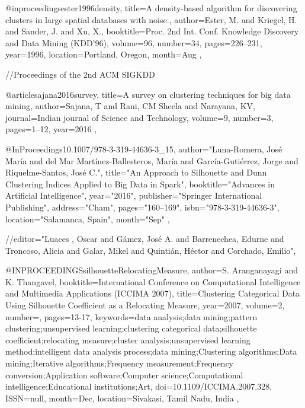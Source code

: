 @inproceedings{ester1996density,
  title={A density-based algorithm for discovering clusters in large spatial databases with noise.},
  author={Ester, M. and Kriegel, H. and Sander, J. and Xu, X.},
  booktitle={Proc. 2nd Int. Conf. Knowledge Discovery and Data Mining (KDD’96)},
  volume={96},
  number={34},
  pages={226--231},
  year={1996},
  location={Portland, Oregon},
  month={Aug}
},

//Proceedings of the 2nd ACM SIGKDD

@article{sajana2016survey,
  title={A survey on clustering techniques for big data mining},
  author={Sajana, T and Rani, CM Sheela and Narayana, KV},
  journal={Indian journal of Science and Technology},
  volume={9},
  number={3},
  pages={1--12},
  year={2016}
},

@InProceedings{10.1007/978-3-319-44636-3_15,
author="Luna-Romera, Jos{\'e} Mar{\'i}a
and del Mar Mart{\'i}nez-Ballesteros, Mar{\'i}a
and Garc{\'i}a-Guti{\'e}rrez, Jorge
and Riquelme-Santos, Jos{\'e} C.",
title="An Approach to Silhouette and Dunn Clustering Indices Applied to Big Data in Spark",
booktitle="Advances in Artificial Intelligence",
year="2016",
publisher="Springer International Publishing",
address="Cham",
pages="160--169",
isbn="978-3-319-44636-3",
location="Salamanca, Spain",
month="Sep"
},

//editor="Luaces , Oscar
and G{\'a}mez, Jos{\'e} A.
and Barrenechea, Edurne
and Troncoso, Alicia
and Galar, Mikel
and Quinti{\'a}n, H{\'e}ctor
and Corchado, Emilio",

@INPROCEEDINGS{silhouetteRelocatingMeasure, 
author={S. {Aranganayagi} and K. {Thangavel}}, 
booktitle={International Conference on Computational Intelligence and Multimedia Applications (ICCIMA 2007)}, 
title={Clustering Categorical Data Using Silhouette Coefficient as a Relocating Measure}, 
year={2007}, 
volume={2}, 
number={}, 
pages={13-17}, 
keywords={data analysis;data mining;pattern clustering;unsupervised learning;clustering categorical data;silhouette coefficient;relocating measure;cluster analysis;unsupervised learning method;intelligent data analysis process;data mining;Clustering algorithms;Data mining;Iterative algorithms;Frequency measurement;Frequency conversion;Application software;Computer science;Computational intelligence;Educational institutions;Art}, 
doi={10.1109/ICCIMA.2007.328}, 
ISSN={null}, 
month={Dec},
location={Sivakasi, Tamil Nadu, India }},

